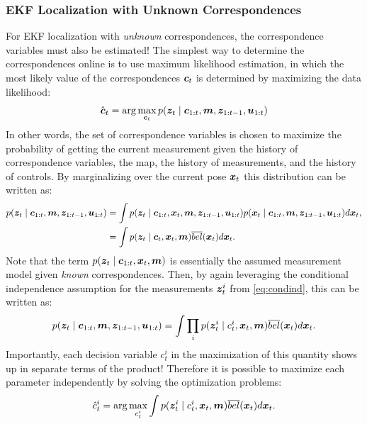 \subsubsection{EKF Localization with Unknown Correspondences}
For EKF localization with \textit{unknown} correspondences, the correspondence variables must also be estimated!
The simplest way to determine the correspondences online is to use maximum likelihood estimation, in which the most likely value of the correspondences $\bm{c}_t$ is determined by maximizing the data likelihood:
\begin{equation*}
    \hat{\bm{c}}_{t} = \arg \max_{\bm{c}_{t}}p(\bm{z}_{t}\mid \bm{c}_{1:t},\bm{m},\bm{z}_{1:t-1},\bm{u}_{1:t})
\end{equation*}
In other words, the set of correspondence variables is chosen to maximize the probability of getting the current measurement given the history of correspondence variables, the map, the history of measurements, and the history of controls. By marginalizing over the current pose $\bm{x}_t$ this distribution can be written as:
\begin{equation*}
\begin{split}
p(\bm{z}_{t}\mid \bm{c}_{1:t},\bm{m},\bm{z}_{1:t-1},\bm{u}_{1:t}) &= \int p(\bm{z}_{t}\mid \bm{c}_{1:t},\bm{x}_t, \bm{m},\bm{z}_{1:t-1},\bm{u}_{1:t}) p(\bm{x}_{t}\mid \bm{c}_{1:t},\bm{m},\bm{z}_{1:t-1},\bm{u}_{1:t}) d\bm{x}_t, \\
&= \int p(\bm{z}_{t}\mid \bm{c}_{t},\bm{x}_t, \bm{m}) \overline{bel}(\bm{x}_t) d\bm{x}_t. \\
\end{split}
\end{equation*}
Note that the term $p(\bm{z}_{t}\mid \bm{c}_{1:t},\bm{x}_t, \bm{m})$ is essentially the assumed measurement model given \textit{known} correspondences. Then, by again leveraging the conditional independence assumption for the measurements $\bm{z}_t^i$ from \eqref{eq:condind}, this can be written as:
\begin{equation*}
\begin{split}
p(\bm{z}_{t}\mid \bm{c}_{1:t},\bm{m},\bm{z}_{1:t-1},\bm{u}_{1:t}) = \int \prod_i p(\bm{z}^i_{t}\mid c^i_{t},\bm{x}_t, \bm{m}) \overline{bel}(\bm{x}_t) d\bm{x}_t. \\
\end{split}
\end{equation*}
Importantly, each decision variable $c_t^i$ in the maximization of this quantity shows up in separate terms of the product! Therefore it is possible to maximize each parameter independently by solving the optimization problems:
\begin{equation*}
\begin{split}
\hat{c}^i_{t} = \arg \max_{c^i_{t}} \int p(\bm{z}^i_{t}\mid c^i_{t},\bm{x}_t, \bm{m}) \overline{bel}(\bm{x}_t) d\bm{x}_t. \\
\end{split}
\end{equation*}
